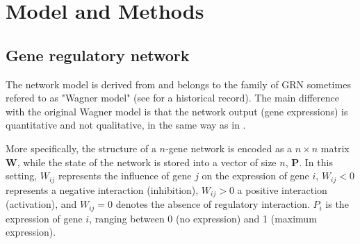 \documentclass[10pt,a4paper]{article}
\begin{document}








\section{Model and Methods}

\subsection{Gene regulatory network}

The network model is derived from \cite{Wag94,Wag96} and belongs to the family of GRN sometimes refered to as "Wagner model" (see \citet{FP15} for a historical record). The main difference with the original Wagner model is that the network output (gene expressions) is quantitative and not qualitative, in the same way as in \cite{SB02}. 

More specifically, the structure of a $n$-gene network is encoded as a $n\times n$ matrix $\bm W$, while the state of the network is stored into a vector of size $n$, $\bm P$. In this setting, $W_{ij}$ represents the influence of gene $j$ on the expression of gene $i$, $W_{ij} < 0$ represents a negative interaction (inhibition), $W_{ij} > 0$ a positive interaction (activation), and $W_{ij} = 0$ denotes the absence of regulatory interaction. $P_i$ is the expression of gene $i$, ranging between 0 (no expression) and 1 (maximum expression). 
\end{document}
